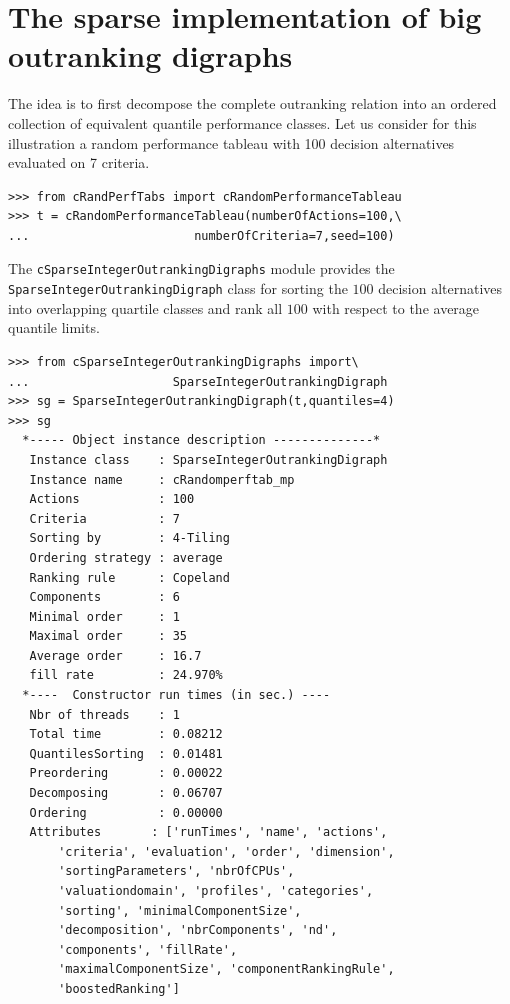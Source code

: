 \section{The sparse implementation of big outranking digraphs}
\label{sec:11.4}

The idea is to first decompose the complete outranking relation into an ordered collection of equivalent quantile performance classes. Let us consider for this illustration a random performance tableau with 100 decision alternatives evaluated on 7 criteria.
\begin{lstlisting}
>>> from cRandPerfTabs import cRandomPerformanceTableau
>>> t = cRandomPerformanceTableau(numberOfActions=100,\
...                       numberOfCriteria=7,seed=100)
\end{lstlisting}

The \texttt{cSparseIntegerOutrankingDigraphs} module provides the\\ \texttt{SparseIntegerOutrankingDigraph} class for sorting the $100$ decision alternatives into overlapping quartile classes and rank all $100$ with respect to the average quantile limits.
\begin{lstlisting}[caption={Constructing the sparse integer outranking digraph},label=list:11.3]
>>> from cSparseIntegerOutrankingDigraphs import\
...                    SparseIntegerOutrankingDigraph
>>> sg = SparseIntegerOutrankingDigraph(t,quantiles=4)
>>> sg
  *----- Object instance description --------------*
   Instance class    : SparseIntegerOutrankingDigraph
   Instance name     : cRandomperftab_mp
   Actions           : 100
   Criteria          : 7
   Sorting by        : 4-Tiling
   Ordering strategy : average
   Ranking rule      : Copeland
   Components        : 6
   Minimal order     : 1
   Maximal order     : 35
   Average order     : 16.7
   fill rate         : 24.970%
  *----  Constructor run times (in sec.) ----
   Nbr of threads    : 1
   Total time        : 0.08212
   QuantilesSorting  : 0.01481
   Preordering       : 0.00022
   Decomposing       : 0.06707
   Ordering          : 0.00000
   Attributes       : ['runTimes', 'name', 'actions',
       'criteria', 'evaluation', 'order', 'dimension',
       'sortingParameters', 'nbrOfCPUs',
       'valuationdomain', 'profiles', 'categories',
       'sorting', 'minimalComponentSize',
       'decomposition', 'nbrComponents', 'nd',
       'components', 'fillRate',
       'maximalComponentSize', 'componentRankingRule',
       'boostedRanking']
\end{lstlisting}


